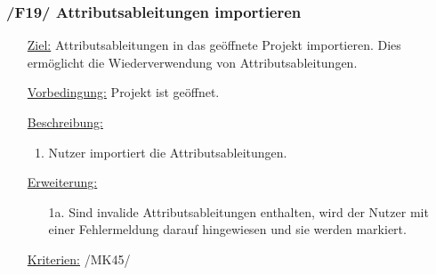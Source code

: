 \documentclass{article}
\begin{document}
\subsubsection*{\textbf{/F19/} Attributsableitungen importieren}
\label{sec:f:Attributsableitungen importieren}
\begin{itemize}
    \item[\underline{Ziel:}] Attributsableitungen in das geöffnete Projekt importieren. Dies ermöglicht die Wiederverwendung von Attributsableitungen.
    \item[\underline{Vorbedingung:}] Projekt ist geöffnet.
    \item[\underline{Beschreibung:}]
    \begin{enumerate}
        \item Nutzer importiert die Attributsableitungen. 
    \end{enumerate}
    \item[\underline{Erweiterung:}]
    \begin{itemize}
        \item[1a.] Sind invalide Attributsableitungen enthalten, wird der Nutzer mit einer Fehlermeldung darauf hingewiesen und sie werden markiert. 
    \end{itemize}
    \item[\underline{Kriterien:}] /MK45/
\end{itemize}
\end{document}
